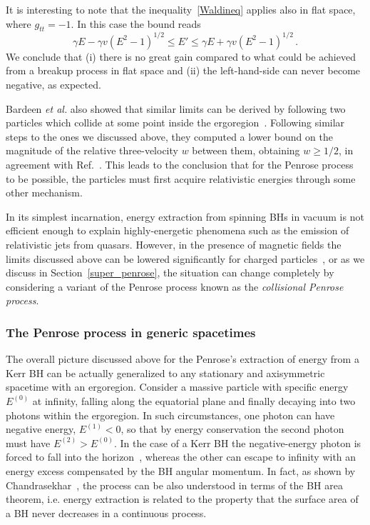 \documentclass[11pt]{article}
\newcommand{\be}{\begin{equation}}
\newcommand{\ee}{\end{equation}}
\numberwithin{equation}{section} %
\begin{document}
It is interesting to note that the inequality~\eqref{Waldineq} applies also in flat space, where $g_{tt}=-1$. In this case the bound reads
%
\be
\gamma E-\gamma v\left(E^2-1\right)^{1/2} \leq E' \leq \gamma E+\gamma v\left(E^2-1\right)^{1/2}\,.
\ee
%
We conclude that (i) there is no great gain compared to what could be achieved from a breakup process in flat space and (ii)
the left-hand-side can never become negative, as expected. 
 
Bardeen \emph{et al.} also showed that similar limits can be derived by following two particles which collide at some point inside the ergoregion~\cite{Bardeen:1972fi}. Following similar steps to the ones we discussed above, they computed a lower bound on the magnitude of the relative three-velocity $w$ between them, obtaining $w\geq 1/2$, in agreement with Ref.~\cite{Wald:1974kya}. This leads to the conclusion that for the Penrose process to be possible, the particles must first acquire relativistic energies through some other mechanism.

In its simplest incarnation, energy extraction from spinning BHs in vacuum is not efficient enough to explain highly-energetic phenomena such as the emission of relativistic jets from quasars. However, in the presence of magnetic fields the limits discussed above can be lowered significantly for charged particles~\cite{1985JApA....6...85B,Wagh:1986tsa,1986ApJ...301.1018W}, or as we discuss in Section~\ref{super_penrose}, the situation can change completely by considering a variant of the Penrose process known as the {\em collisional Penrose process}.

\subsubsection{The Penrose process in generic spacetimes\label{sec:penrosegeneral}}

The overall picture discussed above for the Penrose's extraction of energy from a Kerr BH can be actually generalized to any stationary and axisymmetric spacetime with an ergoregion. Consider a massive particle with specific energy $E^{(0)}$ at infinity, falling along the equatorial plane and finally decaying into two photons within the ergoregion. In such circumstances, one photon can have negative energy, $E^{(1)}<0$, so that by energy conservation the second photon must have $E^{(2)}>E^{(0)}$. In the case of a Kerr BH the negative-energy photon is forced to fall into the horizon~\cite{Contopoulos1984}, whereas the other can escape to infinity with an energy excess compensated by the BH angular momentum. In fact, as shown by Chandrasekhar~\cite{Chandra}, the process can be also understood in terms of the BH area theorem, i.e. energy extraction is related to the property that the surface area of a BH never decreases in a continuous process.
\end{document}
